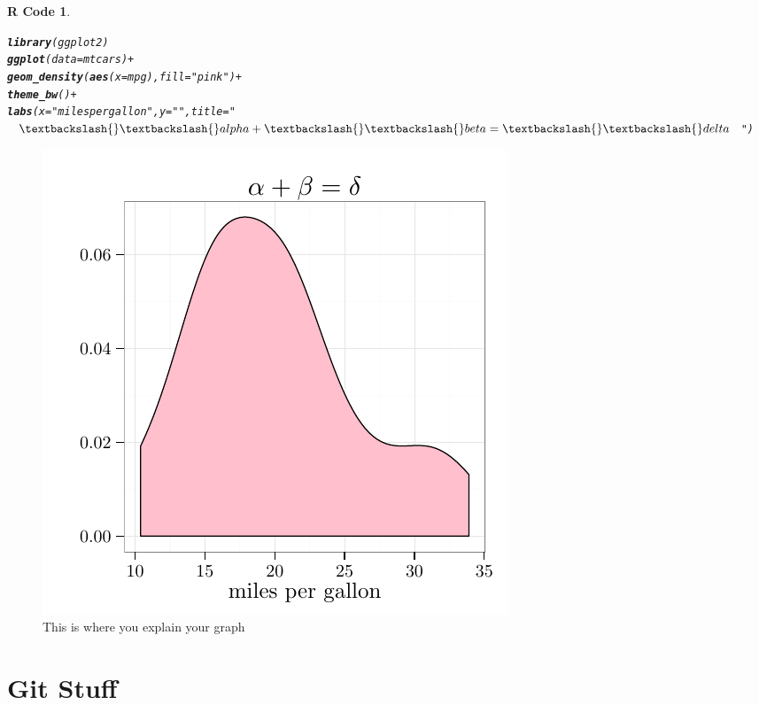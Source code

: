 \documentclass{article}\usepackage[]{graphicx}\usepackage[]{color}
\makeatletter
\newcommand{\hlstr}[1]{\textcolor[rgb]{0.192,0.494,0.8}{#1}}%
\newcommand{\hlopt}[1]{\textcolor[rgb]{0,0,0}{#1}}%
\newcommand{\hlstd}[1]{\textcolor[rgb]{0.345,0.345,0.345}{#1}}%
\newcommand{\hlkwc}[1]{\textcolor[rgb]{0.333,0.667,0.333}{#1}}%
\newcommand{\hlkwd}[1]{\textcolor[rgb]{0.737,0.353,0.396}{\textbf{#1}}}%
\newenvironment{kframe}{%
 \def\at@end@of@kframe{}%
 \ifinner\ifhmode%
  \def\at@end@of@kframe{\end{minipage}}%
  \begin{minipage}{\columnwidth}%
 \fi\fi%
 \def\FrameCommand##1{\hskip\@totalleftmargin \hskip-\fboxsep
 \colorbox{shadecolor}{##1}\hskip-\fboxsep
     \hskip-\linewidth \hskip-\@totalleftmargin \hskip\columnwidth}%
 \MakeFramed {\advance\hsize-\width
   \@totalleftmargin\z@ \linewidth\hsize
   \@setminipage}}%
 {\par\unskip\endMakeFramed%
 \at@end@of@kframe}
\newenvironment{knitrout}{}{} %
\theoremstyle{rcode}
\newtheorem{rcode}{R Code}[section]
\makeatother
\begin{document}
\begin{knitrout}
\color{fgcolor}\begin{kframe}
\begin{rcode}\label{Graph}\hfill{}\begin{alltt}
\hlkwd{library}\hlstd{(ggplot2)}
\hlkwd{ggplot}\hlstd{(}\hlkwc{data} \hlstd{= mtcars)} \hlopt{+}
  \hlkwd{geom_density}\hlstd{(}\hlkwd{aes}\hlstd{(}\hlkwc{x} \hlstd{= mpg),} \hlkwc{fill} \hlstd{=} \hlstr{"pink"}\hlstd{)} \hlopt{+}
  \hlkwd{theme_bw}\hlstd{()} \hlopt{+}
  \hlkwd{labs}\hlstd{(}\hlkwc{x} \hlstd{=} \hlstr{"miles per gallon"}\hlstd{,} \hlkwc{y} \hlstd{=} \hlstr{""}\hlstd{,} \hlkwc{title} \hlstd{=} \hlstr{"$\textbackslash{}\textbackslash{}alpha + \textbackslash{}\textbackslash{}beta = \textbackslash{}\textbackslash{}delta$"}\hlstd{)}
\end{alltt}
\end{rcode}\end{kframe}
\end{knitrout}


\begin{figure}[h]
\begin{knitrout}
\color{fgcolor}

{\centering \includegraphics[width=.5\textwidth]{figure/GraphShow} 

}



\end{knitrout}

\caption{This is where you explain your graph \label{graphDude}}
\end{figure}

\clearpage

\section{Git Stuff}
\end{document}
